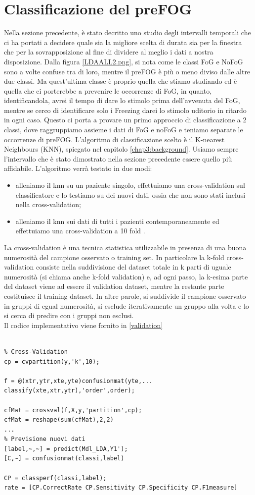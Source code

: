 \section{Classificazione del preFOG}
Nella sezione precedente, è stato decritto uno studio degli intervalli temporali che ci ha portati a decidere quale sia la migliore scelta di durata sia per la finestra che per la sovrapposizione al fine di dividere al meglio i dati a nostra disposizione. Dalla figura \ref{LDAALL2.png}, si nota come le classi FoG e NoFoG sono a volte confuse tra di loro, mentre il preFOG è più o meno diviso dalle altre due classi. Ma quest'ultima classe è proprio quella che stiamo studiando ed è quella che ci porterebbe a prevenire le occorrenze di FoG, in quanto, identificandola, avrei il tempo di dare lo stimolo prima dell'avvenuta del FoG, mentre se cerco di identificare solo i Freezing darei lo stimolo uditorio in ritardo in ogni caso. Questo ci porta a provare un primo approccio di classificazione a 2 classi, dove raggruppiamo assieme i dati di FoG e noFoG e teniamo separate le occorrenze di preFOG. L'algoritmo  di classificazione scelto è il K-nearest Neighbours (KNN), spiegato nel capitolo \ref{chap3:background}. Usiamo sempre l'intervallo che è stato dimostrato nella sezione precedente essere quello più affidabile. L'algoritmo verrà testato in due modi:
\begin{itemize}
	\item alleniamo il knn su un paziente singolo, effettuiamo una cross-validation sul classificatore e lo testiamo su dei nuovi dati, ossia che non sono stati inclusi nella  cross-validation;
	\item alleniamo il knn sui dati di tutti i pazienti contemporaneamente ed effettuiamo una cross-validation a 10 fold .
\end{itemize}
La cross-validation è una tecnica statistica utilizzabile in presenza di una buona numerosità del campione osservato o training set. In particolare la k-fold cross-validation consiste nella suddivisione del dataset totale in k parti di uguale numerosità (si chiama anche k-fold validation) e, ad ogni passo, la k-esima parte del dataset viene ad essere il validation dataset, mentre la restante parte costituisce il training dataset. In altre parole, si suddivide il campione osservato in gruppi di egual numerosità, si esclude iterativamente un gruppo alla volta e lo si cerca di predire con i gruppi non esclusi.\\
Il codice implementativo viene fornito in \ref{validation}

\begin{lstlisting}[style=Matlab-editor,frame=single, caption=Cross-Validation, label=validation]  % Start your code-block

% Cross-Validation
cp = cvpartition(y,'k',10);

f = @(xtr,ytr,xte,yte)confusionmat(yte,...
classify(xte,xtr,ytr),'order',order);

cfMat = crossval(f,X,y,'partition',cp);
cfMat = reshape(sum(cfMat),2,2)
...
% Previsione nuovi dati
[label,~,~] = predict(Mdl_LDA,Y1');
[C,~] = confusionmat(classi,label)

CP = classperf(classi,label);
rate = [CP.CorrectRate CP.Sensitivity CP.Specificity CP.F1measure]
\end{lstlisting}